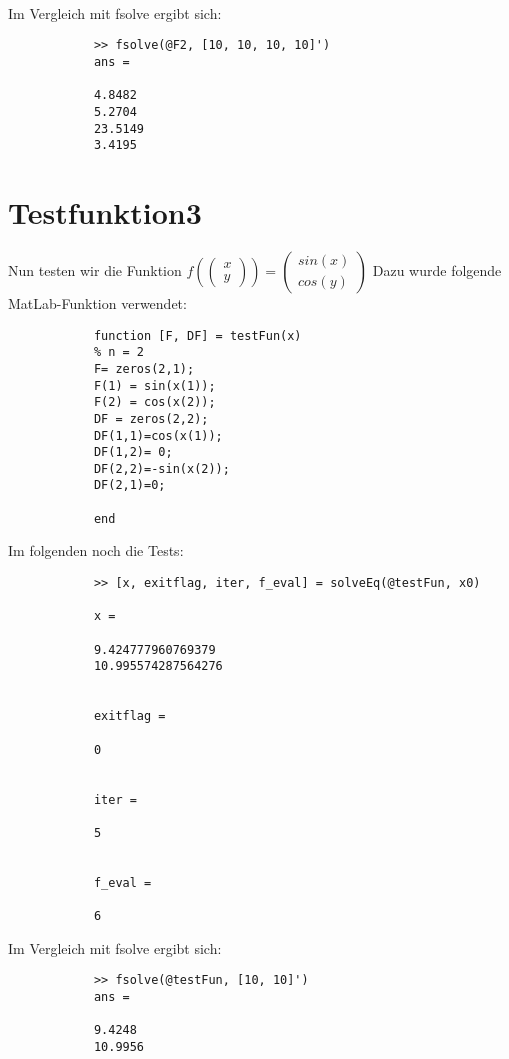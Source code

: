 \documentclass[11pt,titlepage]{article}
\begin{document}
		\begin{lstlisting}
			
		\end{lstlisting}
		
		Im Vergleich mit fsolve ergibt sich:
		
		\begin{lstlisting}
			>> fsolve(@F2, [10, 10, 10, 10]')
			ans =
			
			4.8482
			5.2704
			23.5149
			3.4195	
		\end{lstlisting}
		
	\section{Testfunktion3}
		Nun testen wir die Funktion $ f(\begin{pmatrix} x \\ y \end{pmatrix}) = \begin{pmatrix} sin(x) \\ cos(y) \end{pmatrix}$
		Dazu wurde folgende MatLab-Funktion verwendet:
		\begin{lstlisting}
			function [F, DF] = testFun(x)
			% n = 2    
			F= zeros(2,1);
			F(1) = sin(x(1));
			F(2) = cos(x(2));
			DF = zeros(2,2);
			DF(1,1)=cos(x(1));
			DF(1,2)= 0;
			DF(2,2)=-sin(x(2));
			DF(2,1)=0;    
			
			end
		\end{lstlisting}
		
		Im folgenden noch die Tests:
		
		\begin{lstlisting}
			>> [x, exitflag, iter, f_eval] = solveEq(@testFun, x0)
			
			x =
			
			9.424777960769379
			10.995574287564276
			
			
			exitflag =
			
			0
			
			
			iter =
			
			5
			
			
			f_eval =
			
			6
		\end{lstlisting}
		
		Im Vergleich mit fsolve ergibt sich:
		
		\begin{lstlisting}
			>> fsolve(@testFun, [10, 10]')
			ans =
			
			9.4248  
			10.9956
		\end{lstlisting}
	
\end{document}
